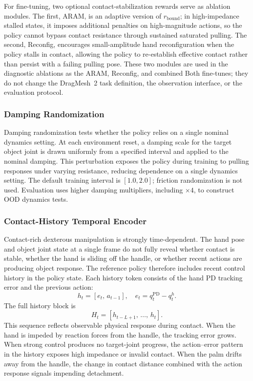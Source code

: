 For fine-tuning, two optional contact-stabilization rewards serve as
ablation modules. The first, ARAM, is an adaptive version of
$r_{\mathrm{bound}}$; in high-impedance stalled states, it imposes
additional penalties on high-magnitude actions, so the policy cannot
bypass contact resistance through sustained saturated pulling. The
second, Reconfig, encourages small-amplitude hand reconfiguration
when the policy stalls in contact, allowing the policy to
re-establish effective contact rather than persist with a failing
pulling pose. These two modules are used in the diagnostic ablations
as the ARAM, Reconfig, and combined Both fine-tunes; they do not
change the DragMesh~2 task definition, the observation interface, or
the evaluation protocol.


\subsubsection{Damping Randomization}
\label{sec:damprand}

Damping randomization tests whether the policy relies on a single
nominal dynamics setting. At each environment reset, a damping scale
for the target object joint is drawn uniformly from a specified
interval and applied to the nominal damping. This perturbation
exposes the policy during training to pulling responses under
varying resistance, reducing dependence on a single dynamics
setting. The default training interval is $[1.0, 2.0]$; friction
randomization is not used. Evaluation uses higher damping
multipliers, including $\times 4$, to construct OOD dynamics tests.


\subsubsection{Contact-History Temporal Encoder}
\label{sec:gla}

Contact-rich dexterous manipulation is strongly time-dependent. The
hand pose and object joint state at a single frame do not fully
reveal whether contact is stable, whether the hand is sliding off the
handle, or whether recent actions are producing object response. The
reference policy therefore includes recent control history in the
policy state. Each history token consists of the hand PD tracking
error and the previous action:
\begin{equation}
h_t = [e_t,\,a_{t-1}],\quad
e_t = q_t^{\mathrm{PD}} - q_t^h.
\label{eq:token}
\end{equation}
The full history block is
\begin{equation}
H_t = [h_{t-L+1},\,\ldots,\,h_t].
\label{eq:block}
\end{equation}
This sequence reflects observable physical response during contact.
When the hand is impeded by reaction forces from the handle, the
tracking error grows. When strong control produces no target-joint
progress, the action--error pattern in the history exposes high
impedance or invalid contact. When the palm drifts away from the
handle, the change in contact distance combined with the action
response signals impending detachment.

